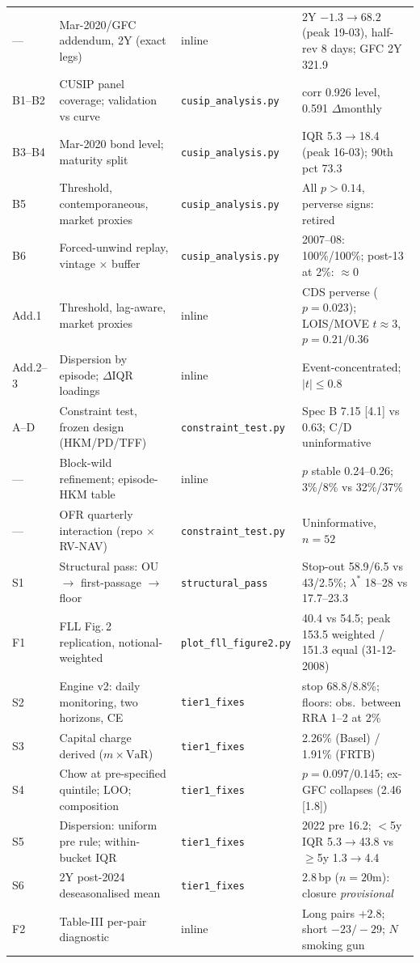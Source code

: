 \documentclass[11pt]{article}
\newcommand{\VaR}{\mathrm{VaR}}
\begin{document}
\begin{table}[h!]
\begin{tabular}{p{0.8cm}p{5.4cm}p{3.2cm}p{4.5cm}}
--- & Mar-2020/GFC addendum, 2Y (exact legs) & inline & 2Y $-1.3\to68.2$ (peak 19-03), half-rev 8 days; GFC 2Y 321.9 \\
B1--B2 & CUSIP panel coverage; validation vs curve & \texttt{cusip\_analysis.py} & corr 0.926 level, 0.591 $\Delta$monthly \\
B3--B4 & Mar-2020 bond level; maturity split & \texttt{cusip\_analysis.py} & IQR 5.3$\to$18.4 (peak 16-03); 90th pct 73.3 \\
B5 & Threshold, contemporaneous, market proxies & \texttt{cusip\_analysis.py} & All $p>0.14$, perverse signs: retired \\
B6 & Forced-unwind replay, vintage $\times$ buffer & \texttt{cusip\_analysis.py} & 2007--08: 100\%/100\%; post-13 at 2\%: $\approx$0 \\
Add.1 & Threshold, lag-aware, market proxies & inline & CDS perverse ($p=0.023$); LOIS/MOVE $t\approx3$, $p=0.21/0.36$ \\
Add.2--3 & Dispersion by episode; $\Delta$IQR loadings & inline & Event-concentrated; $|t|\le0.8$ \\
A--D & Constraint test, frozen design (HKM/PD/TFF) & \texttt{constraint\_test.py} & Spec B 7.15 [4.1] vs 0.63; C/D uninformative \\
--- & Block-wild refinement; episode-HKM table & inline & $p$ stable 0.24--0.26; 3\%/8\% vs 32\%/37\% \\
--- & OFR quarterly interaction (repo $\times$ RV-NAV) & \texttt{constraint\_test.py} & Uninformative, $n=52$ \\
S1 & Structural pass: OU $\to$ first-passage $\to$ floor & \texttt{structural\_pass} & Stop-out 58.9/6.5 vs 43/2.5\%; $\lambda^*$ 18--28 vs 17.7--23.3 \\
F1 & FLL Fig.\,2 replication, notional-weighted & \texttt{plot\_fll\_figure2.py} & 40.4 vs 54.5; peak 153.5 weighted / 151.3 equal (31-12-2008) \\
S2 & Engine v2: daily monitoring, two horizons, CE & \texttt{tier1\_fixes} & stop 68.8/8.8\%; floors: obs.\ between RRA 1--2 at 2\% \\
S3 & Capital charge derived ($m\times\VaR$) & \texttt{tier1\_fixes} & 2.26\% (Basel) / 1.91\% (FRTB) \\
S4 & Chow at pre-specified quintile; LOO; composition & \texttt{tier1\_fixes} & $p=0.097$/0.145; ex-GFC collapses (2.46 [1.8]) \\
S5 & Dispersion: uniform pre rule; within-bucket IQR & \texttt{tier1\_fixes} & 2022 pre 16.2; $<$5y IQR 5.3$\to$43.8 vs $\ge$5y 1.3$\to$4.4 \\
S6 & 2Y post-2024 deseasonalised mean & \texttt{tier1\_fixes} & 2.8\,bp ($n=20$m): closure \emph{provisional} \\
F2 & Table-III per-pair diagnostic & inline & Long pairs $+2.8$; short $-23/-29$; $N$ smoking gun \\
\bottomrule
\end{tabular}
\end{table}
\end{document}
